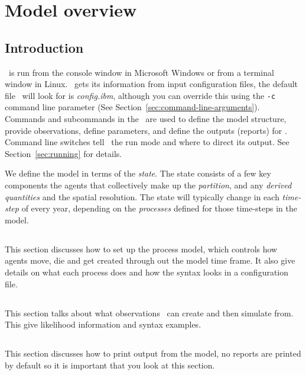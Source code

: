 \section{Model overview\label{sec:overview}}

\subsection{Introduction}

\IBM\ is run from the console window in Microsoft Windows or from a terminal window in Linux. \IBM\ gets its information from input configuration files, the default file \IBM\ will look for is \emph{config.ibm}, although you can override this using the \texttt{-c} command line parameter (See Section~\ref{sec:command-line-arguments}). Commands and subcommands in the \config\ are used to define the model structure, provide observations, define parameters, and define the outputs (reports) for \IBM. Command line switches tell \IBM\ the run mode and where to direct its output. See Section~\ref{sec:running} for details.

We define the model in terms of the \emph{state}. The state consists of a few key components the agents that collectively make up the \emph{partition}, and any \emph{derived quantities} and the spatial resolution. The state will typically change in each \emph{time-step} of every year, depending on the \emph{processes} defined for those time-steps in the model. 

\subsection{}
This section discusses how to set up the process model, which controls how agents move, die and get created through out the model time frame. It also give details on what each process does and how the syntax looks in a configuration file.

\subsection{}
This section talks about what observations \IBM\ can create and then simulate from. This give likelihood information and syntax examples.

\subsection{}
This section discusses how to print output from the model, no reports are printed by default so it is important that you look at this section.